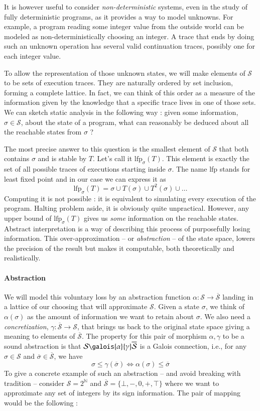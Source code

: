 \documentclass[11pt]{article}
\renewcommand{\S}{\mathcal{S}}
\newcommand{\oS}{\overline{\mathcal{S}}}
\newcommand{\lfp}{\text{lfp}}
\begin{document}
It is however useful to consider \emph{non-deterministic} systems, even in the study of fully deterministic programs, as it provides a way to model unknowns. For example, a program reading some integer value from the outside world can be modeled as non-deterministically choosing an integer. A trace that ends by doing such an unknown operation has several valid continuation traces, possibly one for each integer value.

To allow the representation of those unknown states, we will make elements of $\S$ to be sets of execution traces. They are naturally ordered by set inclusion, forming a complete lattice.
In fact, we can think of this order as a measure of the information given by the knowledge that a specific trace lives in one of those sets.
We can sketch static analysis in the following way : given some information, $\sigma\in\S$, about the state of a program, what can reasonably be deduced about
all the reachable states from $\sigma$ ?

The most precise answer to this question is the smallest element of $\S$ that both contains $\sigma$ and is stable by $T$. Let's call it $\lfp_\sigma(T)$. This element is exactly the set of all possible traces of executions starting inside $\sigma$. The name lfp stands for least fixed point and in our case we can express it as 
\[ \text{lfp}_\sigma(T) = \sigma \cup T(\sigma) \cup T^2(\sigma) \cup \dots \]
Computing it is not possible : it is equivalent to simulating every execution of the program. Halting problem aside, it is obviously quite unpractical. However, any upper bound of $\lfp_\sigma(T)$ gives us \emph{some} information on the reachable states. Abstract interpretation is a way of describing this process of purposefully losing information. This over-approximation -- or \emph{abstraction} -- of the state space, lowers the precision of the result but makes it computable, both theoretically and realistically.

\paragraph{Abstraction} We will model this voluntary loss by an abstraction function $\alpha:\S\to\oS$ landing in a lattice of our choosing that will approximate $\S$. Given a state $\sigma$, we think of $\alpha(\sigma)$ as the amount of information we want to retain about $\sigma$. We also need a \emph{concretization}, $\gamma:\oS\to\S$, that brings us back to the original state space giving a meaning to elements of $\oS$. The property for this pair of morphism $\alpha,\gamma$ to be a sound abstraction is that $\S\galois{\alpha}{\gamma}\oS$ is a Galois connection, i.e., for any $\sigma\in\S$ and $\overline{\sigma}\in\oS$, we have
\[ \sigma \leq \gamma(\overline{\sigma}) \iff \alpha(\sigma) \leq \overline{\sigma} \]
To give a concrete example of such an abstraction -- and avoid breaking with tradition -- consider $\S = 2^{\mathbb{N}}$ and $\oS = \{\bot,-,0,+,\top\}$ where we want to approximate any set of integers by its sign information. The pair of mapping would be the following :
\end{document}
